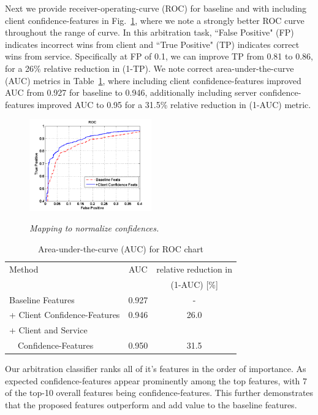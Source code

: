 Next we provide receiver-operating-curve (ROC) for baseline and with including client confidence-features in Fig.~\ref{Fig:Baseline-ClientPred-ROC}, where we note a strongly better ROC curve throughout the range of curve. In this arbitration task, ``False Positive" (FP) indicates incorrect wins from client and ``True Positive" (TP) indicates correct wins from service. Specifically at FP of 0.1, we can improve TP from 0.81 to 0.86, for a 26\% relative reduction in (1-TP). We note correct area-under-the-curve (AUC) metrics in Table~\ref{tab:AUC_ROC}, where including client confidence-features improved AUC from 0.927 for baseline to 0.946, additionally including server confidence-features improved AUC to 0.95 for a 31.5\% relative reduction in (1-AUC) metric.

\begin{figure}[h]
\centering
{\includegraphics[width=0.47\textwidth]{Baseline-ClientPred-ROC}}
\caption{\it Mapping to normalize confidences.}
\label{Fig:Baseline-ClientPred-ROC}
\end{figure}

\begin{table}
\begin{center}
\begin{small}
\caption{Area-under-the-curve (AUC) for ROC chart} \label{tab:AUC_ROC}
\begin{tabular}{|l|c|c|}
\hline
Method & AUC & relative reduction in \\
& & (1-AUC) [\%]\\
\hline
Baseline Features & 0.927 & - \\
\hline
+ Client Confidence-Features & 0.946 & 26.0\\
\hline
+ Client and Service & &\\
~~Confidence-Features & 0.950 & 31.5\\
\hline
\end{tabular}
\end{small}
\end{center}
\end{table}

Our arbitration classifier ranks all of it's features in the order of importance. As expected confidence-features appear prominently among the top features, with 7 of the top-10 overall features being confidence-features. This further demonstrates that the proposed features outperform and add value to the baseline features.
